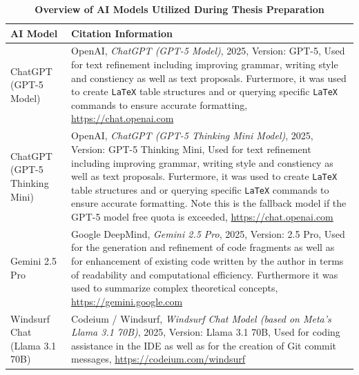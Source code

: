 \documentclass[12pt,a4paper]{article}
\begin{document}
\captionsetup{list=no} %
\begin{table}[H]
    \centering
    \begin{threeparttable}
        \caption{\textbf{Overview of AI Models Utilized During Thesis Preparation}}
        \label{list_of_ai_tools}
        \small
        \begin{tabular}{p{4cm} p{12cm}}
            \toprule
            \textbf{AI Model}                                                 & \textbf{Citation Information} \\
            \midrule
            ChatGPT (GPT-5 Model)                                             &
            OpenAI, \textit{ChatGPT (GPT-5 Model)}, 2025, Version: GPT-5, Used for text refinement including improving grammar, writing style and constiency as well as text proposals. Furtermore, it was used to create \texttt{LaTeX} table structures and or querying specific \texttt{LaTeX} commands to ensure accurate formatting, \url{https://chat.openai.com} \\

            ChatGPT (GPT-5 Thinking Mini)                                     &
            OpenAI, \textit{ChatGPT (GPT-5 Thinking Mini Model)}, 2025, Version: GPT-5 Thinking Mini, Used for text refinement including improving grammar, writing style and constiency as well as text proposals. Furtermore, it was used to create \texttt{LaTeX} table structures and or querying specific \texttt{LaTeX} commands to ensure accurate formatting. Note this is the fallback model if the GPT-5 model free quota is exceeded, \url{https://chat.openai.com} \\

            Gemini 2.5 Pro                                                    &
            Google DeepMind, \textit{Gemini 2.5 Pro}, 2025, Version: 2.5 Pro, Used for the generation and refinement of code fragments as well as for enhancement of existing code written by the author in terms of readability and computational efficiency. Furthermore it was used to summarize complex theoretical concepts, \url{https://gemini.google.com} \\

            Windsurf Chat (Llama 3.1 70B)                                     &
            Codeium / Windsurf, \textit{Windsurf Chat Model (based on Meta’s Llama 3.1 70B)}, 2025, Version: Llama 3.1 70B, Used for coding assistance in the IDE as well as for the creation of Git commit messages, \url{https://codeium.com/windsurf} \\


\end{tabular}
\end{threeparttable}
\end{table}
\end{document}
